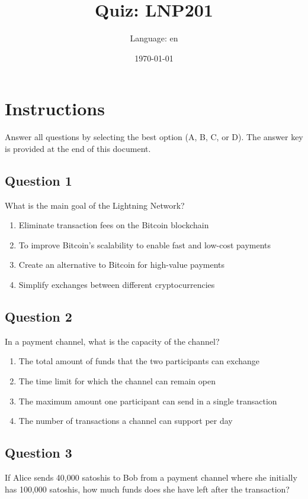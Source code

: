 \documentclass[12pt,a4paper]{article}
\title{Quiz: LNP201}
\author{Language: en}
\date{\today}
\begin{document}
\maketitle
\thispagestyle{fancy}

\section*{Instructions}
Answer all questions by selecting the best option (A, B, C, or D). The answer key is provided at the end of this document.

\bigskip


\subsection*{Question 1}
What is the main goal of the Lightning Network?

\begin{enumerate}[label=\Alph*., leftmargin=*]
\item Eliminate transaction fees on the Bitcoin blockchain
\item To improve Bitcoin's scalability to enable fast and low-cost payments
\item Create an alternative to Bitcoin for high-value payments
\item Simplify exchanges between different cryptocurrencies
\end{enumerate}

\bigskip


\subsection*{Question 2}
In a payment channel, what is the capacity of the channel?

\begin{enumerate}[label=\Alph*., leftmargin=*]
\item The total amount of funds that the two participants can exchange
\item The time limit for which the channel can remain open
\item The maximum amount one participant can send in a single transaction
\item The number of transactions a channel can support per day
\end{enumerate}

\bigskip


\subsection*{Question 3}
If Alice sends 40,000 satoshis to Bob from a payment channel where she initially has 100,000 satoshis, how much funds does she have left after the transaction?
\end{document}
